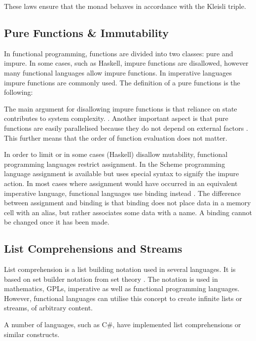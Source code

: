 These laws ensure that the monad behaves in accordance with the Kleisli triple. 

\subsection{Pure Functions \& Immutability}
In functional programming, functions are divided into two classes: pure and impure. In some cases, such as Haskell, impure functions are disallowed, however many functional languages allow impure functions. In imperative languages impure functions are commonly used. The definition of a pure functions is the following:


The main argument for disallowing impure functions is that reliance on state contributes to system complexity. \cite{moseley2006out}. Another important aspect is that pure functions are easily parallelised because they do not depend on external factors \cite{milewski:pure-functions-laziness-io-monads}. This further means that the order of function evaluation does not matter.

In order to limit or in some cases (Haskell) disallow mutability, functional programming languages restrict assignment. In the Scheme programming language assignment is available but uses special syntax to signify the impure action. In most cases where assignment would have occurred in an equivalent imperative language, functional languages use binding instead \cite{milewski:pure-functions-laziness-io-monads}. The difference between assignment and binding is that binding does not place data in a memory cell with an alias, but rather associates some data with a name. A binding cannot be changed once it has been made.

\subsection{List Comprehensions and Streams}
List comprehension is a list building notation used in several languages. It is based on set builder notation from set theory \cite{rosen2011discrete}. The notation is used in mathematics, \acp{GPL}, imperative as well as functional programming languages. However, functional languages can utilise this concept to create infinite lists or streams, of arbitrary content.

A number of languages, such as C\#, have implemented list comprehensions or similar constructs. 